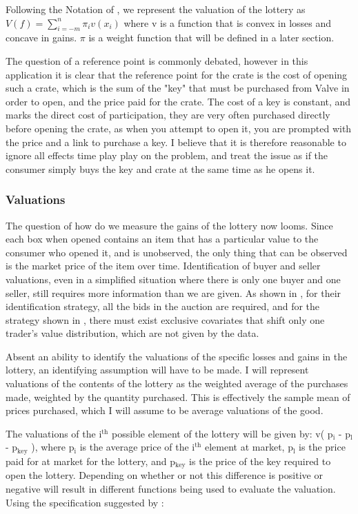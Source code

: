 \documentclass[11pt]{article}
\begin{document}
Following the Notation of \cite{Kahn}, we represent the valuation of the
lottery as $V(f) = \sum_{i=-m}^n \pi_i v(x_i)$ where v is a function that is
convex in losses and concave in gains. $\pi$ is a weight function that
will be defined in a later section.

The question of a reference point is commonly debated, however in this
application it is clear that the reference point for the crate is the
cost of opening such a crate, which is the sum of the "key" that must
be purchased from Valve in order to open, and the price paid for the
crate. The cost of a key is constant, and marks the direct cost of
participation, they are very often purchased directly before opening
the crate, as when you attempt to open it, you are prompted with the
price and a link to purchase a key. I believe that it is therefore
reasonable to ignore all effects time play play on the problem, and
treat the issue as if the consumer simply buys the key and crate at
the same time as he opens it. 

\subsubsection{Valuations}
\label{sec-2-3-1}
The question of how do we measure the gains of the lottery now
looms. Since each box when opened contains an item that has a
particular value to the consumer who opened it, and is unobserved, the
only thing that can be observed is the market price of the item over
time. Identification of buyer and seller valuations, even in a
simplified situation where there is only one buyer and one seller,
still requires more information than we are given. As shown in
\cite{NonParIdent}, for their identification strategy, all the bids in
the auction are required, and for the strategy shown in
\cite{PriceDataOnly}, there must exist exclusive covariates that shift
only one trader's value distribution, which are not given by the data. 

Absent an ability to identify the valuations of the specific losses
and gains in the lottery, an identifying assumption will have to be
made. I will represent valuations of the contents of the lottery as
the weighted average of the purchases made, weighted by the quantity
purchased. This is effectively the sample mean of prices purchased,
which I will assume to be average valuations of the good. 

The valuations of the i$^{\text{th}}$ possible element of the lottery will be
given by: v( p$_{\text{i}}$ - p$_{\text{l}}$ - p$_{\text{key}}$ ), where p$_{\text{i}}$ is the average price of the
i$^{\text{th}}$ element at market, p$_{\text{l}}$ is the price paid for at market for the
lottery, and p$_{\text{key}}$ is the price of the key required to open the
lottery. Depending on whether or not this difference is positive or
negative will result in different functions being used to evaluate the
valuation. Using the specification suggested by \cite{Kahn}:
\end{document}
